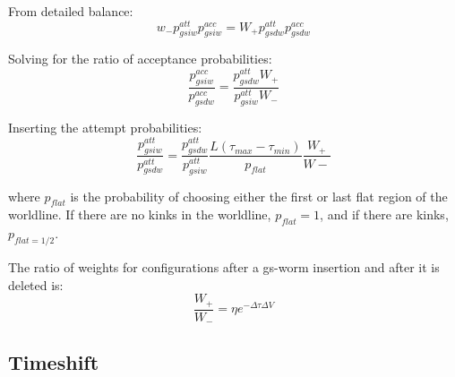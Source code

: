 \documentclass[12pt, two sided]{article}
\begin{document}
    From detailed balance:
    \begin{equation}
        w_- p_{gsiw}^{att} p_{gsiw}^{acc} = W_+ p_{gsdw}^{att} p_{gsdw}^{acc}
    \end{equation}

    Solving for the ratio of acceptance probabilities:
    \begin{equation}
        \frac{p_{gsiw}^{acc}}{p_{gsdw}^{acc}} = \frac{p_{gsdw}^{att} W_+}{p_{gsiw}^{att} W_-}  
    \end{equation}

    Inserting the attempt probabilities:
    \begin{equation}
        \frac{p_{gsiw}^{att}}{p_{gsdw}^{att}} = \frac{p_{gsdw}^{att}}{p_{gsiw}^{att}} \frac{L(\tau_{max}-\tau_{min})}{p_{flat}} \frac{W_+}{W-}
    \end{equation}

    where $p_{flat}$ is the probability of choosing either the first or last flat region of the worldline. If there are no kinks in the worldline, $p_{flat}=1$, and if there are kinks, $p_{flat=1/2}$.


    The ratio of weights for configurations after a gs-worm insertion and after it is deleted is:
    \begin{equation}
        \frac{W_+}{W_-} = \eta e^{-\Delta \tau \Delta V}
    \end{equation}

	\subsection{Timeshift}
\end{document}
